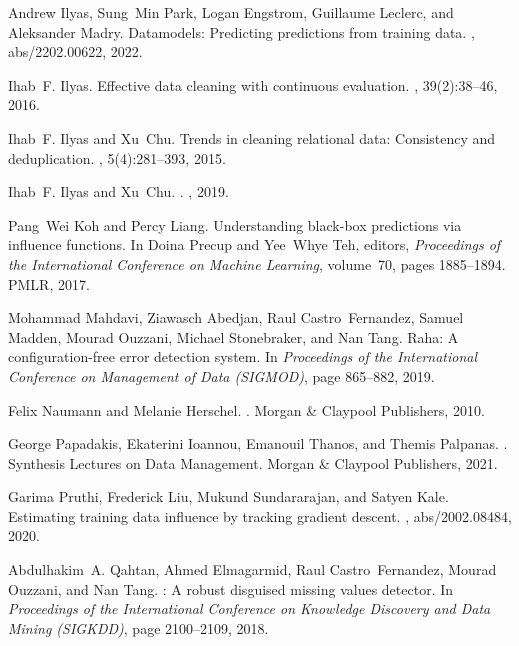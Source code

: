 \documentclass[11pt]{article}
\begin{document}
\begin{thebibliography}{10}
Andrew Ilyas, Sung~Min Park, Logan Engstrom, Guillaume Leclerc, and Aleksander
  Madry.
\newblock Datamodels: Predicting predictions from training data.
, abs/2202.00622, 2022.

Ihab~F. Ilyas.
\newblock Effective data cleaning with continuous evaluation.
, 39(2):38--46, 2016.

Ihab~F. Ilyas and Xu~Chu.
\newblock Trends in cleaning relational data: Consistency and deduplication.
, 5(4):281--393, 2015.

Ihab~F. Ilyas and Xu~Chu.
.
, 2019.

Pang~Wei Koh and Percy Liang.
\newblock Understanding black-box predictions via influence functions.
\newblock In Doina Precup and Yee~Whye Teh, editors, {\em {Proceedings of the
  International Conference on Machine Learning}}, volume~70, pages 1885--1894.
  PMLR, 2017.

Mohammad Mahdavi, Ziawasch Abedjan, Raul Castro~Fernandez, Samuel Madden,
  Mourad Ouzzani, Michael Stonebraker, and Nan Tang.
\newblock Raha: A configuration-free error detection system.
\newblock In {\em Proceedings of the International Conference on Management of
  Data (SIGMOD)}, page 865–882, 2019.

Felix Naumann and Melanie Herschel.
.
\newblock Morgan \& Claypool Publishers, 2010.

George Papadakis, Ekaterini Ioannou, Emanouil Thanos, and Themis Palpanas.
.
\newblock Synthesis Lectures on Data Management. Morgan {\&} Claypool
  Publishers, 2021.

Garima Pruthi, Frederick Liu, Mukund Sundararajan, and Satyen Kale.
\newblock Estimating training data influence by tracking gradient descent.
, abs/2002.08484, 2020.

Abdulhakim~A. Qahtan, Ahmed Elmagarmid, Raul Castro~Fernandez, Mourad Ouzzani,
  and Nan Tang.
: A robust disguised missing values detector.
\newblock In {\em Proceedings of the International Conference on Knowledge
  Discovery and Data Mining (SIGKDD)}, page 2100–2109, 2018.


\end{thebibliography}
\end{document}
